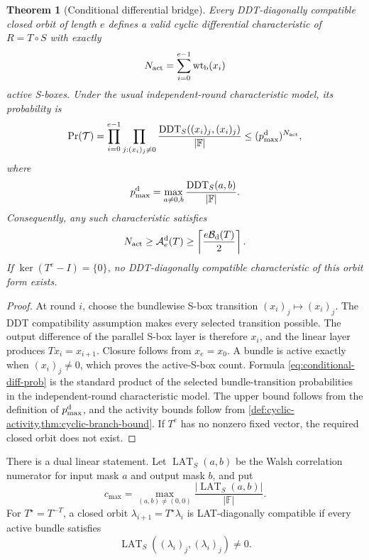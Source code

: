 \documentclass[10pt,reqno]{amsart}
\theoremstyle{plain}
\newtheorem{theorem}{Theorem}[section]
\theoremstyle{remark}\newtheorem{remark}[theorem]{Remark}
\theoremstyle{definition}\newtheorem{definition}[theorem]{Definition}
\newcommand{\F}{\mathbb F}
\newcommand{\wt}{\operatorname{wt}}
\begin{document}
\begin{theorem}[Conditional differential bridge]\label{thm:conditional-differential}
Every DDT-diagonally compatible closed orbit of length $e$ defines a valid cyclic differential characteristic of $R=T\circ S$ with exactly
\[
N_{\rm act}=\sum_{i=0}^{e-1}\wt_{\rm b}(x_i)
\]
active S-boxes. Under the usual independent-round characteristic model, its probability is
\begin{equation}
\Pr(\mathcal T)=
\prod_{i=0}^{e-1}\prod_{j:(x_i)_j\ne0}
\frac{\operatorname{DDT}_S((x_i)_j,(x_i)_j)}{|\F|}
\le
(p_{\max}^{\rm d})^{N_{\rm act}},
\label{eq:conditional-diff-prob}
\end{equation}
where
\[
p_{\max}^{\rm d}=\max_{a\ne0,b}\frac{\operatorname{DDT}_S(a,b)}{|\F|}.
\]
Consequently, any such characteristic satisfies
\[
N_{\rm act}\ge\mathcal A_e^{\rm d}(T)
\ge\left\lceil\frac{e\mathcal B_{\rm d}(T)}2\right\rceil.
\]
If $\ker(T^e-I)=\{0\}$, no DDT-diagonally compatible characteristic of this orbit form exists.
\end{theorem}
\begin{proof}
At round $i$, choose the bundlewise S-box transition $(x_i)_j\mapsto(x_i)_j$. The DDT compatibility assumption makes every selected transition possible. The output difference of the parallel S-box layer is therefore $x_i$, and the linear layer produces $Tx_i=x_{i+1}$. Closure follows from $x_e=x_0$. A bundle is active exactly when $(x_i)_j\ne0$, which proves the active-S-box count. Formula \eqref{eq:conditional-diff-prob} is the standard product of the selected bundle-transition probabilities in the independent-round characteristic model. The upper bound follows from the definition of $p_{\max}^{\rm d}$, and the activity bounds follow from \cref{def:cyclic-activity,thm:cyclic-branch-bound}. If $T^e$ has no nonzero fixed vector, the required closed orbit does not exist. \end{proof}

There is a dual linear statement. Let $\operatorname{LAT}_S(a,b)$ be the Walsh correlation numerator for input mask $a$ and output mask $b$, and put
\[
c_{\max}=\max_{(a,b)\ne(0,0)}\frac{|\operatorname{LAT}_S(a,b)|}{|\F|}.
\]
For $T^\star=T^{-T}$, a closed orbit $\lambda_{i+1}=T^\star\lambda_i$ is LAT-diagonally compatible if every active bundle satisfies
\[
\operatorname{LAT}_S((\lambda_i)_j,(\lambda_i)_j)\ne0.
\]
\end{document}

